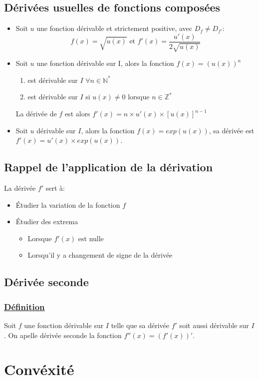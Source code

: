 \documentclass[9pt,twoside]{article}
\newcommand{\definition}[1]{\subsubsection*{\underline{Définition\textit{#1}}}}
\begin{document}
\subsection{Dérivées usuelles de fonctions composées}
\begin{itemize}[label=\textbullet]
	\item Soit $u$ une fonction dérivable et strictement positive, avec $D_f \neq D_{f'}$: 
		$$f(x)=\sqrt{u(x)} \text{ et } f'(x)=\frac{u'(x)}{2\sqrt{u(x)}}$$
	\item Soit $u$ une fonction dérivable sur I, alors la fonction $f(x) = (u(x))^n$
		\begin{enumerate}
			\item est dérivable sur $I$ $\forall n\in \mathbb{N}^{*}$
			\item est dérivable sur $I$ si $u(x)\neq 0$ lorsque $n \in \mathbb{Z}^{*}$
		\end{enumerate}
		La dérivée de $f$ est alors $f'(x) = n \times u'(x) \times [u(x)]^{n-1}$
	\item Soit $u$ dérivable sur $I$, alors la fonction $f(x)=exp(u(x))$, sa dérivée est $f'(x)=u'(x)\times exp(u(x))$.
\end{itemize}
\subsection{Rappel de l'application de la dérivation}
La dérivée $f'$ sert à:
\begin{itemize}[label=\textbullet]
	\item Étudier la variation de la fonction $f$
	\item Étudier des extrema
		\begin{itemize}
			\item Lorsque $f'(x)$ est nulle
			\item Lorsqu'il y a changement de signe de la dérivée
		\end{itemize}
\end{itemize}
\subsection{Dérivée seconde}
\definition{}
Soit $f$ une fonction dérivable sur $I$ telle que sa dérivée $f'$ soit aussi dérivable sur $I$. On apelle dérivée seconde la fonction $f''(x)=(f'(x))'$.

\section{Convéxité}
\end{document}
